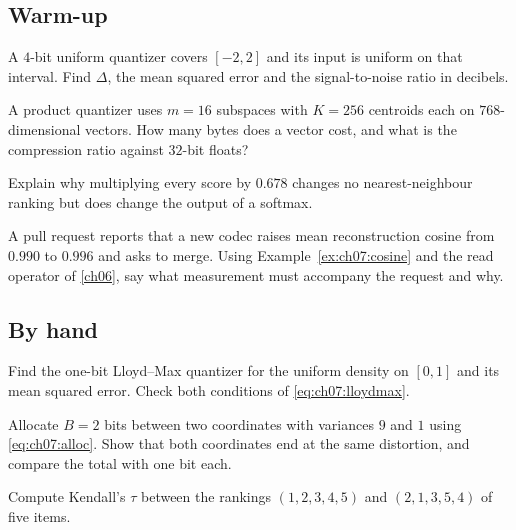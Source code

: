 \subsection*{Warm-up}

\begin{exercise}\label{exr:ch07:1}
A $4$-bit uniform quantizer covers $[-2,2]$ and its input is uniform on that interval. Find $\Delta$, the mean squared error and the signal-to-noise ratio in decibels.
\end{exercise}

\begin{exercise}\label{exr:ch07:2}
A product quantizer uses $m=16$ subspaces with $K=256$ centroids each on $768$-dimensional vectors. How many bytes does a vector cost, and what is the compression ratio against $32$-bit floats?
\end{exercise}

\begin{exercise}\label{exr:ch07:3}
Explain why multiplying every score by $0.678$ changes no nearest-neighbour ranking but does change the output of a softmax.
\end{exercise}

\begin{exercise}\label{exr:ch07:4}
A pull request reports that a new codec raises mean reconstruction cosine from $0.990$ to $0.996$ and asks to merge. Using Example~\ref{ex:ch07:cosine} and the read operator of \cref{ch06}, say what measurement must accompany the request and why.
\end{exercise}

\subsection*{By hand}

\begin{exercise}\label{exr:ch07:5}
Find the one-bit Lloyd--Max quantizer for the uniform density on $[0,1]$ and its mean squared error. Check both conditions of \cref{eq:ch07:lloydmax}.
\end{exercise}

\begin{exercise}\label{exr:ch07:6}
Allocate $B=2$ bits between two coordinates with variances $9$ and $1$ using \cref{eq:ch07:alloc}. Show that both coordinates end at the same distortion, and compare the total with one bit each.
\end{exercise}

\begin{exercise}\label{exr:ch07:7}
Compute Kendall's $\tau$ between the rankings $(1,2,3,4,5)$ and $(2,1,3,5,4)$ of five items.
\end{exercise}

